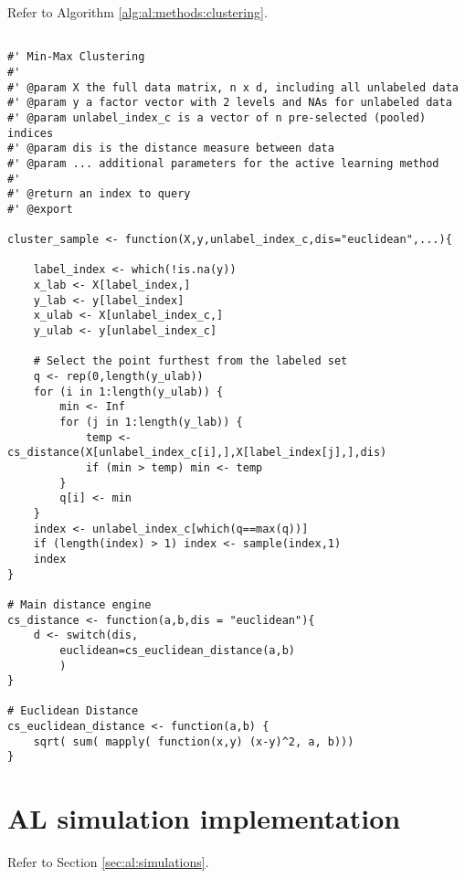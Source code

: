 Refer to Algorithm \ref{alg:al:methods:clustering}. 
{
\begin{lstlisting}

#' Min-Max Clustering
#'
#' @param X the full data matrix, n x d, including all unlabeled data
#' @param y a factor vector with 2 levels and NAs for unlabeled data
#' @param unlabel_index_c is a vector of n pre-selected (pooled) indices
#' @param dis is the distance measure between data
#' @param ... additional parameters for the active learning method
#'
#' @return an index to query
#' @export

cluster_sample <- function(X,y,unlabel_index_c,dis="euclidean",...){

	label_index <- which(!is.na(y))
	x_lab <- X[label_index,]
	y_lab <- y[label_index]
	x_ulab <- X[unlabel_index_c,]
	y_ulab <- y[unlabel_index_c]
	
	# Select the point furthest from the labeled set
	q <- rep(0,length(y_ulab))
	for (i in 1:length(y_ulab)) {
		min <- Inf
		for (j in 1:length(y_lab)) {
			temp <- cs_distance(X[unlabel_index_c[i],],X[label_index[j],],dis)
			if (min > temp) min <- temp
		}
		q[i] <- min
	}
	index <- unlabel_index_c[which(q==max(q))]
	if (length(index) > 1) index <- sample(index,1)
	index
}

# Main distance engine
cs_distance <- function(a,b,dis = "euclidean"){
	d <- switch(dis,
		euclidean=cs_euclidean_distance(a,b)
		)
}

# Euclidean Distance
cs_euclidean_distance <- function(a,b) {
	sqrt( sum( mapply( function(x,y) (x-y)^2, a, b)))
}
\end{lstlisting}
}

\section{AL simulation implementation}
\label{sec:appendicies:al:simulations}

Refer to Section \ref{sec:al:simulations}.
